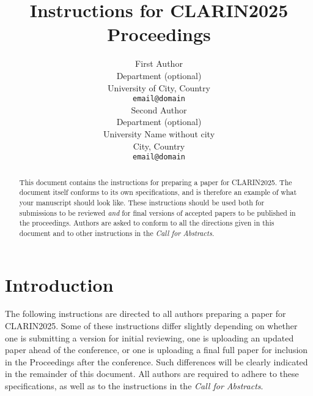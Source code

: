 \documentclass[a4paper,11pt]{article}
\title{Instructions for CLARIN2025 Proceedings}
\author{First Author \\
  Department (optional)\\
  University of City, Country \\
  {\tt email@domain} \\\And %
  Second Author \\
  Department (optional)\\
  University Name without city \\
  City, Country \\
 {\tt email@domain} \\
}
\date{}
\begin{document}
\maketitle
\begin{abstract}
  This document contains the instructions for preparing a paper for CLARIN2025.
  The document itself conforms to its own specifications, and is therefore an example of what your manuscript should look like. These instructions should be used both for submissions to be reviewed \emph{and} for final versions of accepted papers to be published in the proceedings.
  Authors are asked to conform to all the directions
  given in this document and to other instructions in the \emph{Call for Abstracts.}
\end{abstract}

\section{Introduction} \label{intro}

%

The following instructions are directed to all authors preparing a paper for CLARIN2025.
Some of these instructions differ slightly depending on whether one is submitting a version for initial reviewing, one is uploading an updated paper ahead of the conference, or one is uploading a final full paper for inclusion in the Proceedings after the conference.
Such differences will be clearly indicated in the remainder of this document.
All authors are required to adhere to these specifications,
as well as to the instructions in the \emph{Call for Abstracts}.
\end{document}
